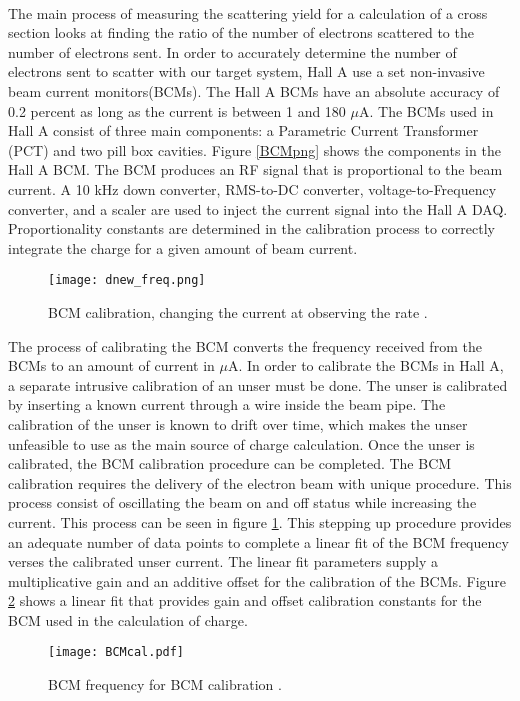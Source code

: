 	\paragraph{} The main process of measuring the scattering yield for a calculation of a cross section looks at finding the ratio of the number of electrons scattered to the number of electrons sent. In order to accurately determine the number of electrons sent to scatter with our target system, Hall A use a set non-invasive beam current monitors(BCMs). The Hall A BCMs have an absolute accuracy of 0.2 percent as long as the current is between 1 and 180 $\mu$A. The BCMs used in Hall A consist of three main components: a Parametric Current Transformer (PCT) and two pill box cavities. Figure \ref{BCMpng} shows the components in the Hall A BCM.  The BCM produces an RF signal that is proportional to the beam current. A 10 kHz down converter, RMS-to-DC converter, voltage-to-Frequency converter, and a scaler are used to inject the current signal into the Hall A DAQ. Proportionality constants are determined in the calibration process to correctly integrate the charge for a given amount of beam current\cite{BCM1}.
	\begin{figure}[t]
		\centering
		\texttt{[image: dnew\_freq.png]}
		\caption{BCM calibration, changing the current at observing the rate \cite{MikeTh}.
		\label{dnewfreq}}
	\end{figure}
	The process of calibrating the BCM converts the frequency received from the BCMs to an amount of current in $\mu$A. In order to calibrate the BCMs in Hall A, a separate intrusive calibration of an unser must be done. The unser is calibrated by inserting a known current through a wire inside the beam pipe. The calibration of the unser is known to drift over time, which makes the unser unfeasible to use as the main source of charge calculation. Once the unser is calibrated, the BCM calibration procedure can be completed. The BCM calibration requires the delivery of the electron beam with unique procedure. This process consist of oscillating the beam on and off status while increasing the current. This process can be seen in figure \ref{dnewfreq}. This stepping up procedure provides an adequate number of data points to complete a linear fit of the BCM frequency verses the calibrated unser current. The linear fit parameters supply a multiplicative gain and an additive offset for the calibration of the BCMs. Figure \ref{bcmcal} shows a linear fit that provides gain and offset calibration constants for the BCM used in the calculation of charge. 
	\begin{figure}[t]
		\centering
		\texttt{[image: BCMcal.pdf]}
		\caption{BCM frequency for BCM calibration \cite{MikeTh}.
			\label{bcmcal}}
	\end{figure}	
	  
